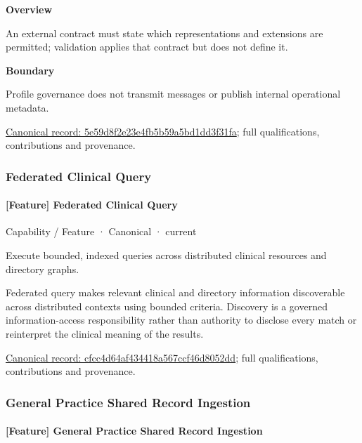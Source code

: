 \textbf{Overview}



An external contract must state which representations and extensions are permitted; validation applies that contract but does not define it.



\textbf{Boundary}



Profile governance does not transmit messages or publish internal operational metadata.


{\footnotesize \href{../../../../continuum/strategy/capability/feature/5e59d8f2e23e4fb5b59a5bd1dd3f31fa.md}{Canonical record: 5e59d8f2e23e4fb5b59a5bd1dd3f31fa}; full qualifications, contributions and provenance.}\par
\subsubsection{Federated Clinical Query}

\paragraph{[Feature] Federated Clinical Query}

\label{element:cfcc4d64af434418a567ccf46d8052dd}
{\small Capability / Feature · Canonical · current}\par

Execute bounded, indexed queries across distributed clinical resources and directory graphs.



Federated query makes relevant clinical and directory information discoverable across distributed contexts using bounded criteria. Discovery is a governed information-access responsibility rather than authority to disclose every match or reinterpret the clinical meaning of the results.


{\footnotesize \href{../../../../continuum/strategy/capability/feature/cfcc4d64af434418a567ccf46d8052dd.md}{Canonical record: cfcc4d64af434418a567ccf46d8052dd}; full qualifications, contributions and provenance.}\par
\subsubsection{General Practice Shared Record Ingestion}

\paragraph{[Feature] General Practice Shared Record Ingestion}

